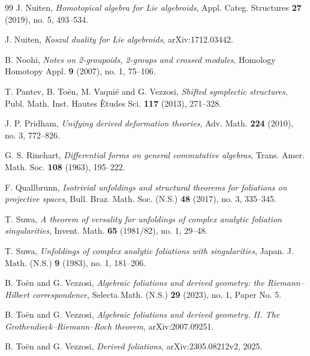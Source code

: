 \documentclass[11pt,reqno,a4paper,dvipsnames,x11names]{amsart}
\numberwithin{equation}{section}
\theoremstyle{plain}
\theoremstyle{definition}
\theoremstyle{remark}
\begin{document}
\begin{thebibliography}{99}
J. Nuiten,
\emph{Homotopical algebra for Lie algebroids},
Appl. Categ. Structures \textbf{27} (2019), no. 5, 493--534.

J. Nuiten,
\emph{Koszul duality for Lie algebroids},
arXiv:1712.03442.

B. Noohi,
\emph{Notes on 2-groupoids, 2-groups and crossed modules},
Homology Homotopy Appl. \textbf{9} (2007), no. 1, 75--106.

T. Pantev, B. To\"en, M. Vaqui\'e and G. Vezzosi,
\emph{Shifted symplectic structures},
Publ. Math. Inst. Hautes \`Etudes Sci. \textbf{117} (2013), 271--328.

J. P. Pridham,
\emph{Unifying derived deformation theories},
Adv. Math. \textbf{224} (2010), no. 3, 772--826.

G. S. Rinehart,
\emph{Differential forms on general commutative algebras},
Trans. Amer. Math. Soc. \textbf{108} (1963), 195--222.

F. Quallbrunn,
\emph{Isotrivial unfoldings and structural theorems for foliations on projective spaces},
Bull. Braz. Math. Soc. (N.S.) \textbf{48} (2017), no. 3, 335--345.

T. Suwa,
\emph{A theorem of versality for unfoldings of complex analytic foliation singularities},
Invent. Math. \textbf{65} (1981/82), no. 1, 29--48.

T. Suwa,
\emph{Unfoldings of complex analytic foliations with singularities},
Japan. J. Math. (N.S.) \textbf{9} (1983), no. 1, 181--206.

B. To\"en and G. Vezzosi,
\emph{Algebraic foliations and derived geometry: the Riemann--Hilbert correspondence},
Selecta Math. (N.S.) \textbf{29} (2023), no. 1, Paper No. 5.

B. To\"en and G. Vezzosi,
\emph{Algebraic foliations and derived geometry. II. The Grothendieck--Riemann--Roch theorem},
arXiv:2007.09251.

B. To\"en and G. Vezzosi,
\emph{Derived foliations},
arXiv:2305.08212v2, 2025.

\end{thebibliography}
\end{document}
